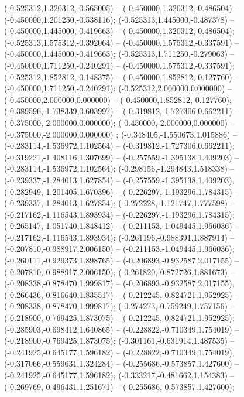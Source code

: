  (-0.525312,1.320312,-0.565005) -- (-0.450000,1.320312,-0.486504) -- (-0.450000,1.201250,-0.538116);
 (-0.525313,1.445000,-0.487378) -- (-0.450000,1.445000,-0.419663) -- (-0.450000,1.320312,-0.486504);
 (-0.525313,1.575312,-0.392064) -- (-0.450000,1.575312,-0.337591) -- (-0.450000,1.445000,-0.419663);
 (-0.525313,1.711250,-0.279063) -- (-0.450000,1.711250,-0.240291) -- (-0.450000,1.575312,-0.337591);
 (-0.525312,1.852812,-0.148375) -- (-0.450000,1.852812,-0.127760) -- (-0.450000,1.711250,-0.240291);
 (-0.525312,2.000000,0.000000) -- (-0.450000,2.000000,0.000000) -- (-0.450000,1.852812,-0.127760);
 (-0.389596,-1.738339,0.603997) -- (-0.319812,-1.727306,0.662211) -- (-0.375000,-2.000000,0.000000);
 (-0.450000,-2.000000,0.000000) -- (-0.375000,-2.000000,0.000000) ;
 (-0.348405,-1.550673,1.015886) -- (-0.283114,-1.536972,1.102564) -- (-0.319812,-1.727306,0.662211);
 (-0.319221,-1.408116,1.307699) -- (-0.257559,-1.395138,1.409203) -- (-0.283114,-1.536972,1.102564);
 (-0.298156,-1.294843,1.518338) -- (-0.239337,-1.284013,1.627854) -- (-0.257559,-1.395138,1.409203);
 (-0.282949,-1.201405,1.670396) -- (-0.226297,-1.193296,1.784315) -- (-0.239337,-1.284013,1.627854);
 (-0.272228,-1.121747,1.777598) -- (-0.217162,-1.116543,1.893934) -- (-0.226297,-1.193296,1.784315);
 (-0.265147,-1.051740,1.848412) -- (-0.211153,-1.049445,1.966036) -- (-0.217162,-1.116543,1.893934);
 (-0.261196,-0.988391,1.887914) -- (-0.207810,-0.988917,2.006150) -- (-0.211153,-1.049445,1.966036);
 (-0.260111,-0.929373,1.898765) -- (-0.206893,-0.932587,2.017155) -- (-0.207810,-0.988917,2.006150);
 (-0.261820,-0.872726,1.881673) -- (-0.208338,-0.878470,1.999817) -- (-0.206893,-0.932587,2.017155);
 (-0.266436,-0.816640,1.835517) -- (-0.212245,-0.824721,1.952925) -- (-0.208338,-0.878470,1.999817);
 (-0.274273,-0.759249,1.757156) -- (-0.218900,-0.769425,1.873075) -- (-0.212245,-0.824721,1.952925);
 (-0.285903,-0.698412,1.640865) -- (-0.228822,-0.710349,1.754019) -- (-0.218900,-0.769425,1.873075);
 (-0.301161,-0.631914,1.487535) -- (-0.241925,-0.645177,1.596182) -- (-0.228822,-0.710349,1.754019);
 (-0.317066,-0.559631,1.324284) -- (-0.255686,-0.573857,1.427600) -- (-0.241925,-0.645177,1.596182);
 (-0.333217,-0.481662,1.154383) -- (-0.269769,-0.496431,1.251671) -- (-0.255686,-0.573857,1.427600);
